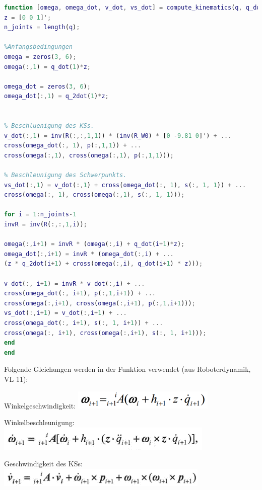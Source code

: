 \begin{lstlisting}[frame=single, basicstyle=\footnotesize, language=Matlab]
function [omega, omega_dot, v_dot, vs_dot] = compute_kinematics(q, q_dot, q_2dot, R, R_W0, p, s)
z = [0 0 1]';
n_joints = length(q);

%Anfangsbedingungen
omega = zeros(3, 6);
omega(:,1) = q_dot(1)*z;

omega_dot = zeros(3, 6);
omega_dot(:,1) = q_2dot(1)*z;


% Beschluenigung des KSs.
v_dot(:,1) = inv(R(:,:,1,1)) * (inv(R_W0) * [0 -9.81 0]') + ...
cross(omega_dot(:, 1), p(:,1,1)) + ...
cross(omega(:,1), cross(omega(:,1), p(:,1,1))); 

% Beschleunigung des Schwerpunkts.	
vs_dot(:,1) = v_dot(:,1) + cross(omega_dot(:, 1), s(:, 1, 1)) + ...
cross(omega(:, 1), cross(omega(:,1), s(:, 1, 1))); 

for i = 1:n_joints-1
invR = inv(R(:,:,1,i));

omega(:,i+1) = invR * (omega(:,i) + q_dot(i+1)*z);
omega_dot(:,i+1) = invR * (omega_dot(:,i) + ...
(z * q_2dot(i+1) + cross(omega(:,i), q_dot(i+1) * z)));

v_dot(:, i+1) = invR * v_dot(:,i) + ...
cross(omega_dot(:, i+1), p(:,1,i+1)) + ...
cross(omega(:,i+1), cross(omega(:,i+1), p(:,1,i+1)));
vs_dot(:,i+1) = v_dot(:,i+1) + ...
cross(omega_dot(:, i+1), s(:, 1, i+1)) + ...
cross(omega(:, i+1), cross(omega(:,i+1), s(:, 1, i+1)));
end
end
\end{lstlisting}


Folgende Gleichungen werden in der Funktion verwendet (aus Roboterdynamik, VL 11):

Winkelgeschwindigkeit: \includegraphics[width=0.4\linewidth]{grafic/omega_gleichung} 

Winkelbeschleunigung: \includegraphics[width=0.6\linewidth]{grafic/omega_dot_gleichung} 

Geschwindigkeit des KSs: \includegraphics[width=0.64\linewidth]{grafic/v_dot_gleichung}

